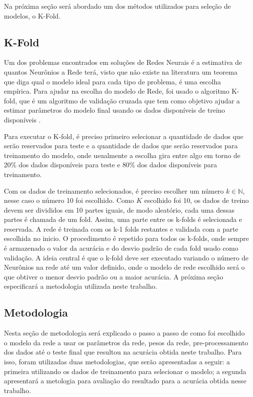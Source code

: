 Na próxima seção será abordado um dos métodos utilizados para seleção de modelos, o K-Fold.

\subsection{K-Fold}
 
 Um dos problemas encontrados em soluções de Redes Neurais é a estimativa de quantos Neurônios a Rede terá, visto que não existe na literatura um teorema que diga qual o modelo ideal para cada tipo de problema, é uma escolha empírica. Para ajudar na escolha do modelo de Rede, foi usado o algoritmo K-fold, que é um algoritmo de validação cruzada que tem como objetivo ajudar a estimar parâmetros do modelo final usando os dados disponíveis de treino disponíveis \cite{bengio2004no}.
 
  Para executar o K-fold, é preciso primeiro selecionar a quantidade de dados que serão reservados para teste e a quantidade de dados que serão reservados para treinamento do modelo, onde usualmente a escolha gira entre algo em torno de 20\% dos dados disponíveis para teste e 80\% dos dados disponíveis para treinamento.
  
  Com os dados de treinamento selecionados, é preciso escolher um número $k \in \mathbb{N}$, nesse caso o número 10 foi escolhido. Como $K$ escolhido foi 10, os dados de treino devem ser divididos em 10 partes iguais, de modo aleatório, cada uma dessas partes é chamada de um fold. Assim, uma parte entre os k-folds é selecionada e reservada. A rede é treinada com os k-1 folds restantes e validada com a parte escolhida no inicio. O procedimento é repetido para todos os k-folds, onde sempre é armazenado o valor da acurácia e do desvio padrão de cada fold usado como validação. A ideia central é que o k-fold deve ser executado variando o número de Neurônios na rede até um valor definido, onde o modelo de rede escolhido será o que obtiver o menor desvio padrão ou a maior acurácia. A próxima seção especificará a metodologia utilizada neste trabalho.

\subsection{Metodologia}

Nesta seção de metodologia será explicado o passo a passo de como foi escolhido o modelo da rede a usar os parâmetros da rede, pesos da rede, pre-processamento dos dados até o teste final que resultou na acurácia obtida neste trabalho. Para isso, foram utilizadas duas metodologias, que serão apresentadas a seguir: a primeira utilizando os dados de treinamento para selecionar o modelo; a segunda apresentará a metologia para avaliação do resultado para a acurácia obtida nesse trabalho.

